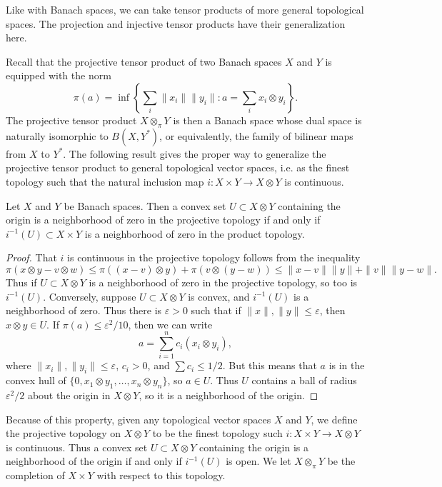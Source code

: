 Like with Banach spaces, we can take tensor products of more general topological spaces. The projection and injective tensor products have their generalization here.

Recall that the projective tensor product of two Banach spaces $X$ and $Y$ is equipped with the norm
%
\[ \pi(a) = \inf \left\{ \sum_i \| x_i \| \| y_i \| : a = \sum_i x_i \otimes y_i \right\}. \]
%
The projective tensor product $X \otimes_\pi Y$ is then a Banach space whose dual space is naturally isomorphic to $B(X,Y^*)$, or equivalently, the family of bilinear maps from $X$ to $Y^*$. The following result gives the proper way to generalize the projective tensor product to general topological vector spaces, i.e. as the finest topology such that the natural inclusion map $i: X \times Y \to X \otimes Y$ is continuous.

\begin{lemma}
    Let $X$ and $Y$ be Banach spaces. Then a convex set $U \subset X \otimes Y$ containing the origin is a neighborhood of zero in the projective topology if and only if $i^{-1}(U) \subset X \times Y$ is a neighborhood of zero in the product topology.
\end{lemma}
\begin{proof}
    That $i$ is continuous in the projective topology follows from the inequality
    \[ \pi(x \otimes y - v \otimes w) \leq \pi((x - v) \otimes y) + \pi(v \otimes (y - w)) \leq \| x - v \| \| y \| + \| v \| \| y - w \|. \]
    Thus if $U \subset X \otimes Y$ is a neighborhood of zero in the projective topology, so too is $i^{-1}(U)$. Conversely, suppose $U \subset X \otimes Y$ is convex, and $i^{-1}(U)$ is a neighborhood of zero. Thus there is $\varepsilon > 0$ such that if $\| x \|, \| y \| \leq \varepsilon$, then $x \otimes y \in U$. If $\pi(a) \leq \varepsilon^2 / 10$, then we can write
    \[ a = \sum_{i = 1}^n c_i (x_i \otimes y_i), \]
    where $\| x_i \|, \| y_i \| \leq \varepsilon$, $c_i > 0$, and $\sum c_i \leq 1/2$. But this means that $a$ is in the convex hull of $\{ 0, x_1 \otimes y_1, \dots, x_n \otimes y_n \}$, so $a \in U$. Thus $U$ contains a ball of radius $\varepsilon^2/2$ about the origin in $X \otimes Y$, so it is a neighborhood of the origin.
\end{proof}

Because of this property, given any topological vector spaces $X$ and $Y$, we define the projective topology on $X \otimes Y$ to be the finest topology such $i: X \times Y \to X \otimes Y$ is continuous. Thus a convex set $U \subset X \otimes Y$ containing the origin is a neighborhood of the origin if and only if $i^{-1}(U)$ is open. We let $X \otimes_\pi Y$ be the completion of $X \times Y$ with respect to this topology.

